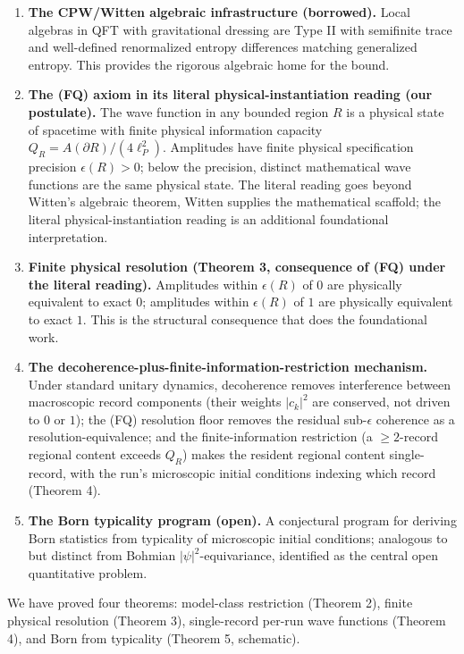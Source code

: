 \documentclass[11pt,a4paper]{article}
\begin{document}
\begin{enumerate}
  \item \textbf{The CPW/Witten algebraic infrastructure (borrowed).} Local algebras in QFT with gravitational dressing are Type II with semifinite trace and well-defined renormalized entropy differences matching generalized entropy. This provides the rigorous algebraic home for the bound.
  \item \textbf{The (FQ) axiom in its literal physical-instantiation reading (our postulate).} The wave function in any bounded region $R$ is a physical state of spacetime with finite physical information capacity $Q_R = A(\partial R)/(4\ell_P^2)$. Amplitudes have finite physical specification precision $\epsilon(R) > 0$; below the precision, distinct mathematical wave functions are the same physical state. The literal reading goes beyond Witten's algebraic theorem, Witten supplies the mathematical scaffold; the literal physical-instantiation reading is an additional foundational interpretation.
  \item \textbf{Finite physical resolution (Theorem 3, consequence of (FQ) under the literal reading).} Amplitudes within $\epsilon(R)$ of $0$ are physically equivalent to exact $0$; amplitudes within $\epsilon(R)$ of $1$ are physically equivalent to exact $1$. This is the structural consequence that does the foundational work.
  \item \textbf{The decoherence-plus-finite-information-restriction mechanism.} Under standard unitary dynamics, decoherence removes interference between macroscopic record components (their weights $|c_k|^2$ are conserved, not driven to $0$ or $1$); the (FQ) resolution floor removes the residual sub-$\epsilon$ coherence as a resolution-equivalence; and the finite-information restriction (a $\ge 2$-record regional content exceeds $Q_R$) makes the resident regional content single-record, with the run's microscopic initial conditions indexing which record (Theorem 4).
  \item \textbf{The Born typicality program (open).} A conjectural program for deriving Born statistics from typicality of microscopic initial conditions; analogous to but distinct from Bohmian $|\psi|^2$-equivariance, identified as the central open quantitative problem.
\end{enumerate}

We have proved four theorems: model-class restriction (Theorem 2), finite physical resolution (Theorem 3), single-record per-run wave functions (Theorem 4), and Born from typicality (Theorem 5, schematic).
\end{document}
